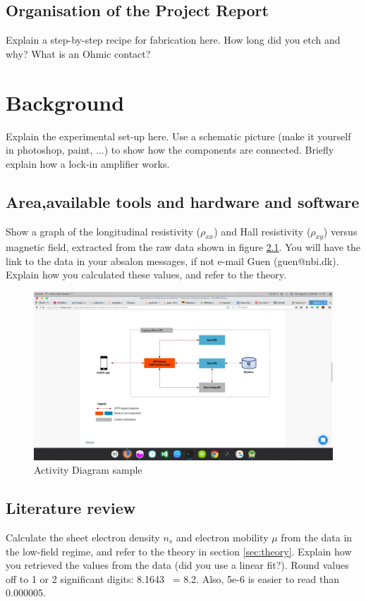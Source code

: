 \documentclass[a4paper]{report}
\begin{document}
    \section{Organisation of the Project Report}    
    Explain a step-by-step recipe for fabrication here. How long did you etch and why? What is an Ohmic contact?
    
    
    \chapter {Background}
    Explain the experimental set-up here. Use a schematic picture (make it yourself in photoshop, paint, ...) to show how the components are connected. Briefly explain how a lock-in amplifier works.
    
    \section{Area,available tools and hardware and software}
    Show a graph of the longitudinal resistivity ($\rho_{xx}$) and Hall resistivity ($\rho_{xy}$) versus magnetic field, extracted from the raw data shown in figure \ref{fig:data}. You will have the link to the data in your absalon messages, if not e-mail Guen (guen@nbi.dk). Explain how you calculated these values, and refer to the theory.
    
    \begin{figure}
    \centering
    \includegraphics[width=1\textwidth]{test.png}
    \caption{\label{fig:data} Activity Diagram sample}
    \end{figure}
    
    \section{Literature review}
    Calculate the sheet electron density $n_{s}$ and electron mobility $\mu$ from the data in the low-field regime, and refer to the theory in section \ref{sec:theory}. Explain how you retrieved the values from the data (did you use a linear fit?).
    Round values off to 1 or 2 significant digits: 8.1643 ~= 8.2. Also, 5e-6 is easier to read than 0.000005.
    
\end{document}
